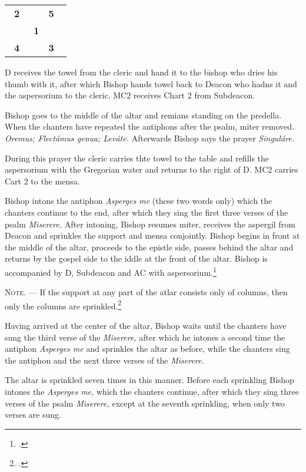\documentclass[letterpaper]{report}
\newcommand\crossplan{
\begin{center}
    \begin{tabular}{ | l c r | }
       \hline
       \cross\ \textbf{2} &                    & \textbf{5} \cross\ \\
                          & \cross\ \textbf{1} &                    \\
       \cross\ \textbf{4} &                    & \textbf{3} \cross\ \\
       \hline
   \end{tabular} 
\end{center}
}
\begin{document}
{\crossplan

D receives the towel from the cleric and hand it to the bishop who dries his
thumb with it, after which Bishop hands towel back to Deacon who hadns it and the
aspersorium to the cleric. MC2 receives Chart 2 from Subdeacon.

\rubric Bishop goes to the middle of the altar and remians standing on the predella.
When the chanters have repeated the antiphons after the psalm, miter removed.
\textit{Oremus; Flectámus genua; Leváte.} Afterwards Bishop says the prayer
\textit{Singuláre.}

During this prayer the cleric carries thte towel to the table and refills the
aspersorium with the Gregorian water and returns to the right of D. MC2 carries
Cart 2 to the mensa.

\rubric Bishop intons the antiphon \textit{Asperges me} (these two words only) which
the chanters continue to the end, after which they sing the first three verses
of the psalm \textit{Miserere.} After intoning, Bishop resumes miter, receives the
aspergil from Deacon and sprinkles the support and mensa conjointly. Bishop begins in
front at the middle of the altar, proceeds to the epistle side, passes behind
the altar and returns by the gospel side to the iddle at the front of the
altar. Bishop is accompanied by D, Subdeacon and AC with aspersorium.\footcite[If the back
part of the altar is attached to the wall, so that the bishop cannot go around
it, he sprinkles only the \textit{base} of the base of the altar when passing
from the middle to the epistle corner, then the epistle side of the altar,
afterwards the table of the altar from the epistle corner to the gospel corner,
then the gospel side of the altar and finaly the \textit{base} in front of the
altar from the gospel corner to the middle.][footnote, p. 68.]{consecranda}

\textsc{Note. ---} If the support at any part of the atlar consists only of
columns, then only the columns are sprinkled.\footcite[][p. 68.]{consecranda}

\rubric Having arrived at the center of the altar, Bishop waits until the chanters
have sung the third verse of the \textit{Miserere,} after which he intones a
second time the antiphon \textit{Asperges me} and sprinkles the altar as
before, while the chanters sing the antiphon and the next three verses of the
\textit{Miserere.}

\rubric The altar is sprinkled seven times in this manner. Before each
sprinkling Bishop intones the \textit{Asperges me,} which the chanters continue,
after which they sing three verses of the psalm \textit{Miserere,} except at
the seventh sprinkling, when only two verses are sung.

}
\end{document}
